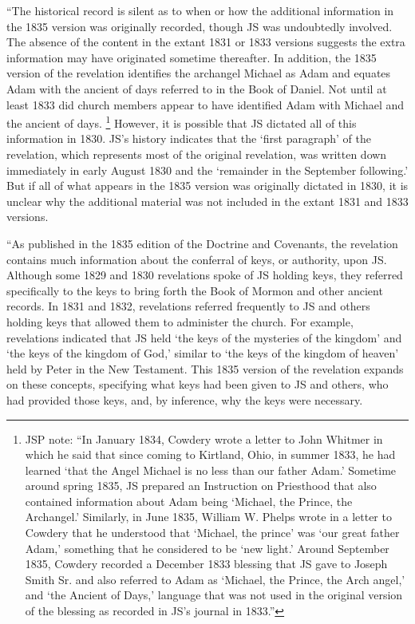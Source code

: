 			``The historical record is silent as to when or how the additional information in the 1835 version was originally recorded, though JS was undoubtedly involved. The absence of the content in the extant 1831 or 1833 versions suggests the extra information may have originated sometime thereafter. In addition, the 1835 version of the revelation identifies the archangel Michael as Adam and equates Adam with the ancient of days referred to in the Book of Daniel. Not until at least 1833 did church members appear to have identified Adam with Michael and the ancient of days.%
				\footnote{%
					JSP note: ``In January 1834, Cowdery wrote a letter to John Whitmer in which he said that since coming to Kirtland, Ohio, in summer 1833, he had learned `that the Angel Michael is no less than our father Adam.' Sometime around spring 1835, JS prepared an Instruction on Priesthood that also contained information about Adam being `Michael, the Prince, the Archangel.' Similarly, in June 1835, William W. Phelps wrote in a letter to Cowdery that he understood that `Michael, the prince' was `our great father Adam,' something that he considered to be `new light.' Around September 1835, Cowdery recorded a December 1833 blessing that JS gave to Joseph Smith Sr. and also referred to Adam as `Michael, the Prince, the Arch angel,' and `the Ancient of Days,' language that was not used in the original version of the blessing as recorded in JS's journal in 1833.''
					}
			However, it is possible that JS dictated all of this information in 1830. JS's history indicates that the `first paragraph' of the revelation, which represents most of the original revelation, was written down immediately in early August 1830 and the `remainder in the September following.' But if all of what appears in the 1835 version was originally dictated in 1830, it is unclear why the additional material was not included in the extant 1831 and 1833 versions.
			
			``As published in the 1835 edition of the Doctrine and Covenants, the revelation contains much information about the conferral of keys, or authority, upon JS. Although some 1829 and 1830 revelations spoke of JS holding keys, they referred specifically to the keys to bring forth the Book of Mormon and other ancient records. In 1831 and 1832, revelations referred frequently to JS and others holding keys that allowed them to administer the church. For example, revelations indicated that JS held `the keys of the mysteries of the kingdom' and `the keys of the kingdom of God,' similar to `the keys of the kingdom of heaven' held by Peter in the New Testament. This 1835 version of the revelation expands on these concepts, specifying what keys had been given to JS and others, who had provided those keys, and, by inference, why the keys were necessary.
			
